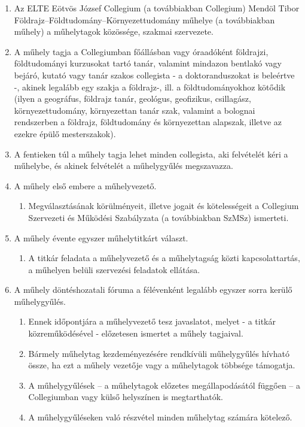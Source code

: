 \documentclass{../styles/rulebook}
\begin{document}
\begin{enumerate}
	\item Az ELTE Eötvös József Collegium (a továbbiakban Collegium) Mendöl Tibor Földrajz--Földtudomány--Környezettudomány műhelye (a továbbiakban műhely) a műhelytagok közössége, szakmai szervezete.
	\item A műhely tagja a Collegiumban főállásban vagy óraadóként földrajzi, földtudományi kurzusokat tartó tanár, valamint mindazon bentlakó vagy bejáró, kutató vagy tanár szakos collegista - a doktoranduszokat is beleértve -, akinek legalább egy szakja a földrajz-, ill. a földtudományokhoz kötődik (ilyen a geográfus, földrajz tanár, geológus, geofizikus, csillagász, környezettudomány, környezettan tanár szak, valamint a bolognai rendszerben a földrajz, földtudomány és környezettan alapszak, illetve az ezekre épülő mesterszakok).
	\item A fentieken túl a műhely tagja lehet minden collegista, aki felvételét kéri a műhelybe, és akinek felvételét a műhelygyűlés megszavazza.
	\item A műhely első embere a műhelyvezető. 
	\begin{enumerate}
		\item Megválasztásának körülményeit, illetve jogait és kötelességeit a Collegium Szervezeti és Működési Szabályzata (a továbbiakban SzMSz) ismerteti.
	\end{enumerate}
	\item A műhely évente egyszer műhelytitkárt választ.
	\begin{enumerate}
		\item A titkár feladata a műhelyvezető és a műhelytagság közti kapcsolattartás, a műhelyen belüli szervezési feladatok ellátása.
	\end{enumerate} 
	\item A műhely döntéshozatali fóruma a félévenként legalább egyszer sorra kerülő műhelygyűlés.
	\begin{enumerate}
		\item Ennek időpontjára a műhelyvezető tesz javaslatot, melyet - a titkár közreműködésével - előzetesen ismertet a műhely tagjaival.
		\item Bármely műhelytag kezdeményezésére rendkívüli műhelygyűlés hívható össze, ha ezt a műhely vezetője vagy a műhelytagok többsége támogatja.
		\item A műhelygyűlések -- a műhelytagok előzetes megállapodásától függően -- a Collegiumban vagy külső helyszínen is megtarthatók. 
		\item A műhelygyűléseken való részvétel minden műhelytag számára kötelező.

\end{enumerate}
\end{enumerate}
\end{document}
